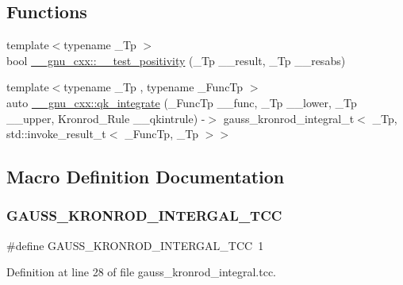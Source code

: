 \subsection*{Functions}
\begin{DoxyCompactItemize}
\item 
{\footnotesize template$<$typename \+\_\+\+Tp $>$ }\\bool \hyperlink{namespace____gnu__cxx_a5e2bf5bffa1d3764b8dc10d04d5c66db}{\+\_\+\+\_\+gnu\+\_\+cxx\+::\+\_\+\+\_\+test\+\_\+positivity} (\+\_\+\+Tp \+\_\+\+\_\+result, \+\_\+\+Tp \+\_\+\+\_\+resabs)
\item 
{\footnotesize template$<$typename \+\_\+\+Tp , typename \+\_\+\+Func\+Tp $>$ }\\auto \hyperlink{namespace____gnu__cxx_a02cfb416b1f1cc3a5dd2b12af3877bd4}{\+\_\+\+\_\+gnu\+\_\+cxx\+::qk\+\_\+integrate} (\+\_\+\+Func\+Tp \+\_\+\+\_\+func, \+\_\+\+Tp \+\_\+\+\_\+lower, \+\_\+\+Tp \+\_\+\+\_\+upper, Kronrod\+\_\+\+Rule \+\_\+\+\_\+qkintrule) -\/$>$ gauss\+\_\+kronrod\+\_\+integral\+\_\+t$<$ \+\_\+\+Tp, std\+::invoke\+\_\+result\+\_\+t$<$ \+\_\+\+Func\+Tp, \+\_\+\+Tp $>$$>$
\end{DoxyCompactItemize}


\subsection{Macro Definition Documentation}
\mbox{\label{gauss__kronrod__integral_8tcc_aa9eb111a71ca7ff9b6e4a1136a08c8a2}} 
\subsubsection{\texorpdfstring{G\+A\+U\+S\+S\+\_\+\+K\+R\+O\+N\+R\+O\+D\+\_\+\+I\+N\+T\+E\+R\+G\+A\+L\+\_\+\+T\+CC}{GAUSS\_KRONROD\_INTERGAL\_TCC}}
{\footnotesize\ttfamily \#define G\+A\+U\+S\+S\+\_\+\+K\+R\+O\+N\+R\+O\+D\+\_\+\+I\+N\+T\+E\+R\+G\+A\+L\+\_\+\+T\+CC~1}



Definition at line 28 of file gauss\+\_\+kronrod\+\_\+integral.\+tcc.

